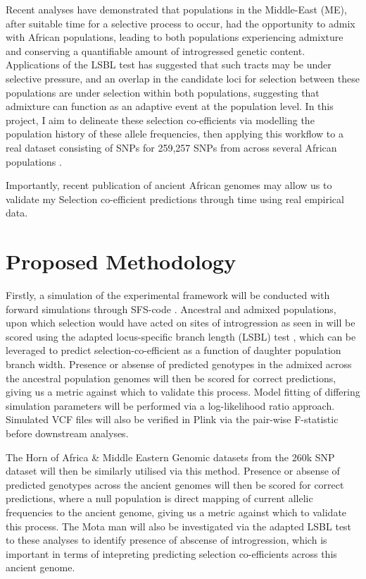 \documentclass[11pt, a4paper]{article}
\begin{document}
Recent analyses \cite{Gresham2017} have demonstrated that populations in the Middle-East (ME), after suitable time for a selective process to occur, had the opportunity to admix with African populations, leading to both populations experiencing admixture and conserving a quantifiable amount of introgressed genetic content. Applications of the LSBL test has suggested that such tracts may be under selective pressure, and an overlap in the candidate loci for selection between these populations are under selection within both populations, suggesting that admixture can function as an adaptive event at the population level. In this project, I aim to delineate these selection co-efficients via modelling the population history of these allele frequencies, then applying this workflow to a real dataset consisting of SNPs for 259,257 SNPs from across several African populations \cite{Hodgson2014}.

\begin{sloppypar}
Importantly, recent publication of ancient African genomes \cite{Skoglund2017, llorente2015ancient} may allow us to validate my Selection co-efficient predictions through time using real empirical data.
\end{sloppypar}
	
			
	\section{Proposed Methodology}
Firstly, a simulation of the experimental framework will be conducted with forward simulations through SFS-code \cite{Hernandez2008}. Ancestral and admixed populations, upon which selection would have acted on sites of introgression as seen in \cite{Gresham2017} will be scored using the adapted locus-specific branch length (LSBL) test \cite{Gresham2017}, which can be leveraged to predict selection-co-efficient as a function of daughter population branch width. Presence or absense of predicted genotypes in the admixed  across the ancestral population genomes will then be scored for correct predictions, giving us a metric against which to validate this process. Model fitting of differing simulation parameters will be performed via a log-likelihood ratio approach. Simulated VCF files will also be verified in Plink \cite{Chang2015} via the pair-wise F-statistic before downstream analyses. 

The Horn of Africa \& Middle Eastern Genomic datasets from the 260k SNP dataset \cite{Hodgson2014} will then be similarly utilised via this method. Presence or absense of predicted genotypes across the ancient genomes will then be scored for correct predictions, where a null population is direct mapping of current allelic frequencies to the ancient genome, giving us a metric against which to validate this process. The Mota man \cite{llorente2015ancient} will also be investigated via the adapted LSBL test to these analyses to identify presence of abscense of introgression, which is important in terms of intepreting predicting selection co-efficients across this ancient genome.
\end{document}
